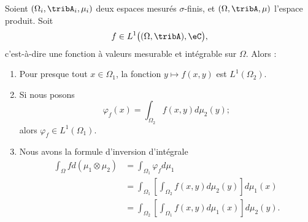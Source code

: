 \begin{theorem}\label{ThoFubinioYLtPI}
    Soient \( (\Omega_i,\tribA_i,\mu_i)\) deux espaces mesurés \( \sigma\)-finis, et \( (\Omega,\tribA,\mu)\) l'espace produit. Soit
    \begin{equation}
        f\in L^1\big( (\Omega,\tribA),\eC \big),
    \end{equation}
    c'est-à-dire une fonction à valeurs mesurable et intégrable sur \( \Omega\). Alors :
    \begin{enumerate}
        \item       \label{ITEMooVFGWooZTePQS}
            Pour presque tout \( x\in \Omega_1\), la fonction \( y\mapsto f(x,y)\) est \( L^1(\Omega_2)\).
        \item       \label{ITEMooCYMKooUdizni}
            Si nous posons
            \begin{equation}
                \varphi_f(x)=\int_{\Omega_2}f(x,y)d\mu_2(y);
            \end{equation}
            alors \( \varphi_f\in L^1(\Omega_1)\).
        \item   \label{ItemQMWiolgiii}
            Nous avons la formule d'inversion d'intégrale
            \begin{subequations}
                \begin{align}
                \int_{\Omega}fd(\mu_1\otimes \mu_2)&=\int_{\Omega_1}\varphi_fd\mu_1\\
                &=\int_{\Omega_1}\left[ \int_{\Omega_2}f(x,y)d\mu_2(y) \right]d\mu_1(x)\\
                &=\int_{\Omega_2}\left[ \int_{\Omega_1}f(x,y)d\mu_1(x) \right]d\mu_2(y).
                \end{align}
            \end{subequations}
    \end{enumerate}

\end{theorem}

